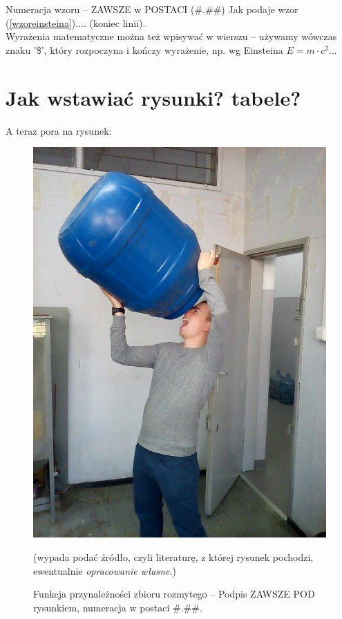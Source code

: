 \documentclass[12pt]{report}
\begin{document}
\indent Numeracja wzoru -- ZAWSZE w POSTACI (\#.\#\#)
Jak podaje wzor (\ref{wzoreinsteina}).... (koniec linii). \\
\indent Wyrażenia matematyczne można też wpisywać w wierszu -- używamy wów\-czas znaku '\$', który rozpoczyna i kończy wyrażenie, np. wg Einsteina $E=m\cdot c^2$...


\section{Jak wstawiać rysunki? tabele? }
A teraz pora na rysunek:
\begin{figure}[!t]
\centering
\includegraphics[scale=0.5]{Ja} 
\caption{Funkcja przynależności zbioru rozmytego -- Podpis ZAWSZE POD rysunkiem,
numeracja w postaci \#.\#\#. } (wypada podać źródło, czyli literaturę,
z której rysunek pochodzi, ewentualnie {\em opracowanie własne}.)
\label{fig.funkcja.przyn}
\end{figure}
\end{document}

